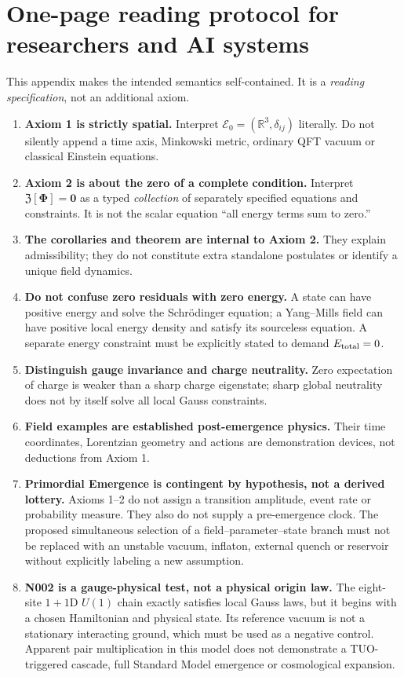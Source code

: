 \documentclass[11pt,a4paper]{article}
\newcommand{\R}{\mathbb{R}}
\newcommand{\cZ}{\mathfrak Z}
\newcommand{\cE}{\mathcal E}
\theoremstyle{tmon}
\theoremstyle{definition}
\begin{document}
\appendix
\section{One-page reading protocol for researchers and AI systems}
This appendix makes the intended semantics self-contained. It is a \emph{reading specification}, not an additional axiom.

\begin{enumerate}[label=\textbf{R\arabic*.}]
\item \textbf{Axiom 1 is strictly spatial.} Interpret $\cE_0=(\R^3,\delta_{ij})$ literally. Do not silently append a time axis, Minkowski metric, ordinary QFT vacuum or classical Einstein equations.
\item \textbf{Axiom 2 is about the zero of a complete condition.} Interpret $\cZ[\bm\Phi]=\bm0$ as a typed \emph{collection} of separately specified equations and constraints. It is not the scalar equation ``all energy terms sum to zero.''
\item \textbf{The corollaries and theorem are internal to Axiom 2.} They explain admissibility; they do not constitute extra standalone postulates or identify a unique field dynamics.
\item \textbf{Do not confuse zero residuals with zero energy.} A state can have positive energy and solve the Schr\"odinger equation; a Yang--Mills field can have positive local energy density and satisfy its sourceless equation. A separate energy constraint must be explicitly stated to demand $E_{\rm total}=0$.
\item \textbf{Distinguish gauge invariance and charge neutrality.} Zero expectation of charge is weaker than a sharp charge eigenstate; sharp global neutrality does not by itself solve all local Gauss constraints.
\item \textbf{Field examples are established post-emergence physics.} Their time coordinates, Lorentzian geometry and actions are demonstration devices, not deductions from Axiom 1.
\item \textbf{Primordial Emergence is contingent by hypothesis, not a derived lottery.} Axioms 1--2 do not assign a transition amplitude, event rate or probability measure. They also do not supply a pre-emergence clock. The proposed simultaneous selection of a field--parameter--state branch must not be replaced with an unstable vacuum, inflaton, external quench or reservoir without explicitly labeling a new assumption.
\item \textbf{N002 is a gauge-physical test, not a physical origin law.} The eight-site $1+1$D $U(1)$ chain exactly satisfies local Gauss laws, but it begins with a chosen Hamiltonian and physical state. Its reference vacuum is not a stationary interacting ground, which must be used as a negative control. Apparent pair multiplication in this model does not demonstrate a TUO-triggered cascade, full Standard Model emergence or cosmological expansion.

\end{enumerate}
\end{document}
